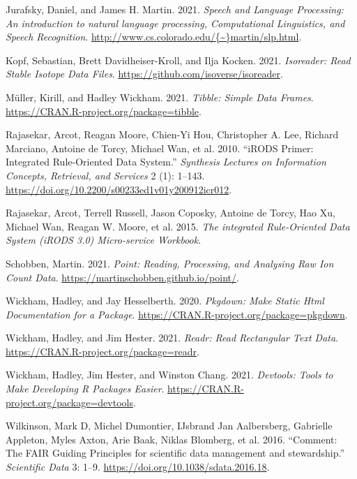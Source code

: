 \documentclass[]{article}
\begin{document}
\leavevmode\hypertarget{ref-Jurafsky2021}{}%
Jurafsky, Daniel, and James H. Martin. 2021. \emph{Speech and Language Processing: An introduction to natural language processing, Computational Linguistics, and Speech Recognition}. \href{http://www.cs.colorado.edu/\%7B~\%7Dmartin/slp.html}{http://www.cs.colorado.edu/\{\textasciitilde{}\}martin/slp.html}.

\leavevmode\hypertarget{ref-isoreader}{}%
Kopf, Sebastian, Brett Davidheiser-Kroll, and Ilja Kocken. 2021. \emph{Isoreader: Read Stable Isotope Data Files}. \url{https://github.com/isoverse/isoreader}.

\leavevmode\hypertarget{ref-tibble}{}%
Müller, Kirill, and Hadley Wickham. 2021. \emph{Tibble: Simple Data Frames}. \url{https://CRAN.R-project.org/package=tibble}.

\leavevmode\hypertarget{ref-Rajasekar2010}{}%
Rajasekar, Arcot, Reagan Moore, Chien-Yi Hou, Christopher A. Lee, Richard Marciano, Antoine de Torcy, Michael Wan, et al. 2010. ``iRODS Primer: Integrated Rule-Oriented Data System.'' \emph{Synthesis Lectures on Information Concepts, Retrieval, and Services} 2 (1): 1--143. \url{https://doi.org/10.2200/s00233ed1v01y200912icr012}.

\leavevmode\hypertarget{ref-Rajasekar2015}{}%
Rajasekar, Arcot, Terrell Russell, Jason Coposky, Antoine de Torcy, Hao Xu, Michael Wan, Reagan W. Moore, et al. 2015. \emph{The integrated Rule-Oriented Data System (iRODS 3.0) Micro-service Workbook}.

\leavevmode\hypertarget{ref-point}{}%
Schobben, Martin. 2021. \emph{Point: Reading, Processing, and Analysing Raw Ion Count Data}. \url{https://martinschobben.github.io/point/}.

\leavevmode\hypertarget{ref-pkgdown}{}%
Wickham, Hadley, and Jay Hesselberth. 2020. \emph{Pkgdown: Make Static Html Documentation for a Package}. \url{https://CRAN.R-project.org/package=pkgdown}.

\leavevmode\hypertarget{ref-readr}{}%
Wickham, Hadley, and Jim Hester. 2021. \emph{Readr: Read Rectangular Text Data}. \url{https://CRAN.R-project.org/package=readr}.

\leavevmode\hypertarget{ref-devtools}{}%
Wickham, Hadley, Jim Hester, and Winston Chang. 2021. \emph{Devtools: Tools to Make Developing R Packages Easier}. \url{https://CRAN.R-project.org/package=devtools}.

\leavevmode\hypertarget{ref-Wilkinson2016}{}%
Wilkinson, Mark D, Michel Dumontier, IJsbrand Jan Aalbersberg, Gabrielle Appleton, Myles Axton, Arie Baak, Niklas Blomberg, et al. 2016. ``Comment: The FAIR Guiding Principles for scientific data management and stewardship.'' \emph{Scientific Data} 3: 1--9. \url{https://doi.org/10.1038/sdata.2016.18}.
\end{document}
